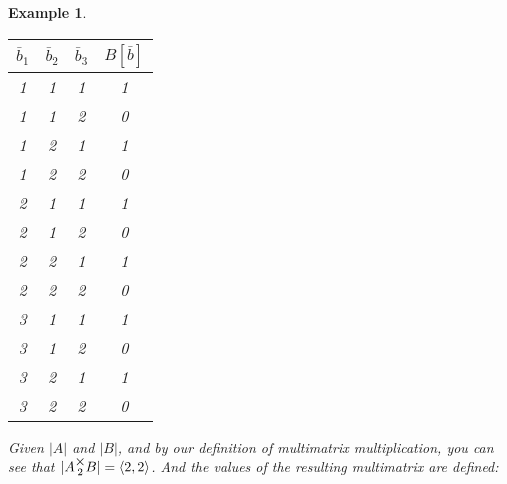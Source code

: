 \documentclass[12pt]{book}
\theoremstyle{definition}
\theoremstyle{plain}
\newtheorem{example}{Example}[chapter]
\theoremstyle{ppart}
\theoremstyle{case}
\theoremstyle{solution}
\newcommand{\mmult}[1]{\text{\raisebox{1ex}{$\underset{#1}{\times}$}}}
\begin{document}
\begin{example}
\begin{table}[h!]
\begin{center}
\begin{tabular}{c c c | c}
$\bar{b}_1$ & $\bar{b}_2$ & $\bar{b}_3$ & $B[\bar{b}]$ \\
\hline
1           & 1           & 1           & 1            \\
1           & 1           & 2           & 0            \\
1           & 2           & 1           & 1            \\
1           & 2           & 2           & 0            \\
2           & 1           & 1           & 1            \\
2           & 1           & 2           & 0            \\
2           & 2           & 1           & 1            \\
2           & 2           & 2           & 0            \\
3           & 1           & 1           & 1            \\
3           & 1           & 2           & 0            \\
3           & 2           & 1           & 1            \\
3           & 2           & 2           & 0
\end{tabular}
\end{center}
\end{table}

Given $|A|$ and $|B|$, and by our definition of multimatrix multiplication,
you can see that $|A \mmult{2} B| = \left<2, 2\right>$. And the values of the
resulting multimatrix are defined:


\end{example}
\end{document}
